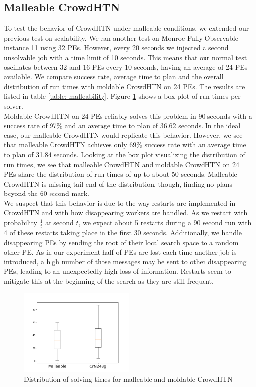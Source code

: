 \subsection{Malleable CrowdHTN}
\label{eval: malleable}
To test the behavior of CrowdHTN under malleable conditions, we extended our previous test on scalability. We ran another test on Monroe-Fully-Observable instance 11 using 32 PEs. However, every 20 seconds we injected a second unsolvable job with a time limit of 10 seconds. This means that our normal test oscillates between 32 and 16 PEs every 10 seconds, having an average of 24 PEs available. We compare success rate, average time to plan and the overall distribution of run times with moldable CrowdHTN on 24 PEs. The results are listed in table \ref{table: malleability}. Figure \ref{figure: malleability} shows a box plot of run times per solver. \\
Moldable CrowdHTN on 24 PEs reliably solves this problem in 90 seconds with a success rate of 97\% and an average time to plan of 36.62 seconds. In the ideal case, our malleable CrowdHTN would replicate this behavior. However, we see that malleable CrowdHTN achieves only 69\% success rate with an average time to plan of 31.84 seconds. Looking at the box plot visualizing the distribution of run times, we see that malleable CrowdHTN and moldable CrowdHTN on 24 PEs share the distribution of run times of up to about 50 seconds. Malleable CrowdHTN is missing tail end of the distribution, though, finding no plans beyond the 60 second mark. \\
We suspect that this behavior is due to the way restarts are implemented in CrowdHTN and with how disappearing workers are handled. As we restart with probability $\frac{1}{t}$ at second $t$, we expect about 5 restarts during a 90 second run with 4 of these restarts taking place in the first 30 seconds. Additionally, we handle disappearing PEs by sending the root of their local search space to a random other PE. As in our experiment half of PEs are lost each time another job is introduced, a high number of those messages may be sent to other disappearing PEs, leading to an unexpectedly high loss of information. Restarts seem to mitigate this at the beginning of the search as they are still frequent.
\begin{figure}[!hbp]
	\caption{Distribution of solving times for malleable and moldable CrowdHTN}
	\label{figure: malleability}
	\centering
	\includegraphics[width=0.5\textwidth]{images/final/malleability}
\end{figure}
